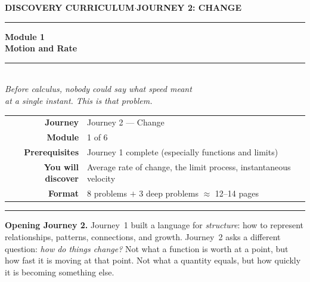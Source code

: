\documentclass[12pt, a4paper]{article}
\newcounter{problem}
\begin{document}

\thispagestyle{empty}
\begin{center}
{\small\color{MidBlue}\textbf{DISCOVERY CURRICULUM}\quad$\cdot$\quad\textbf{JOURNEY 2: CHANGE}}

\vspace{0.6cm}
{\color{NavyBlue}\rule{\linewidth}{2pt}}
\vspace{0.5cm}

{\Huge\bfseries\color{NavyBlue}Module 1}\\[0.3cm]
{\LARGE\bfseries\color{MidBlue}Motion and Rate}\\[0.4cm]
{\color{Gold}\rule{0.4\linewidth}{1.2pt}}\\[0.4cm]
{\large\itshape\color{DarkGrey}
Before calculus, nobody could say what speed meant\\[0.15cm]
at a single instant. This is that problem.}

\vspace{1cm}
\begin{tabular}{rl}
\color{DarkGrey}\textbf{Journey}           & Journey 2 --- Change \\[4pt]
\color{DarkGrey}\textbf{Module}            & 1 of 6 \\[4pt]
\color{DarkGrey}\textbf{Prerequisites}     & Journey 1 complete (especially functions and limits) \\[4pt]
\color{DarkGrey}\textbf{You will discover} & Average rate of change, the limit process, instantaneous velocity \\[4pt]
\color{DarkGrey}\textbf{Format}            & 8 problems $+$ 3 deep problems $\approx$ 12--14 pages \\
\end{tabular}

\vspace{1cm}
{\color{NavyBlue}\rule{\linewidth}{2pt}}
\end{center}

\vspace{0.6cm}

\noindent\textbf{Opening Journey 2.}
Journey~1 built a language for \emph{structure}: how to represent relationships, patterns, connections, and growth. Journey~2 asks a different question: \emph{how do things change?} Not what a function is worth at a point, but how fast it is moving at that point. Not what a quantity equals, but how quickly it is becoming something else.
\end{document}
